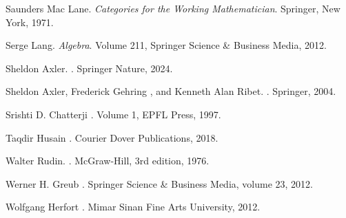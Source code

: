 \documentclass[a4paper, 14pt]{report}
\begin{document}
\begin{onehalfspace}
{\begin{thebibliography}{99}
	Saunders Mac Lane.
	\newblock \emph{Categories for the Working Mathematician}.
	\newblock Springer, New York, 1971.
	
	Serge Lang.
	\newblock \emph{Algebra}.
	\newblock Volume 211, Springer Science \& Business Media, 2012.

		
	Sheldon Axler.
	.
	\newblock Springer Nature, 2024.
	
	Sheldon Axler, Frederick Gehring , and Kenneth Alan Ribet.
	.
	\newblock Springer, 2004.
	
	Srishti D. Chatterji  
	.  
	\newblock Volume 1, EPFL Press, 1997.
	
	Taqdir Husain  
	.  
	\newblock Courier Dover Publications, 2018.
	
	Walter Rudin.  
	.  
	\newblock McGraw-Hill, 3rd edition, 1976.

	Werner H. Greub
	.
	\newblock Springer Science \& Business Media, volume 23, 2012.
	
	
	Wolfgang Herfort  
	.  
	\newblock Mimar Sinan Fine Arts University, 2012. 
	

	
	

	

	

	
	 
	
	
	
	

	
 


	

	
\end{thebibliography}
	
}


\end{onehalfspace} 
\end{document}
